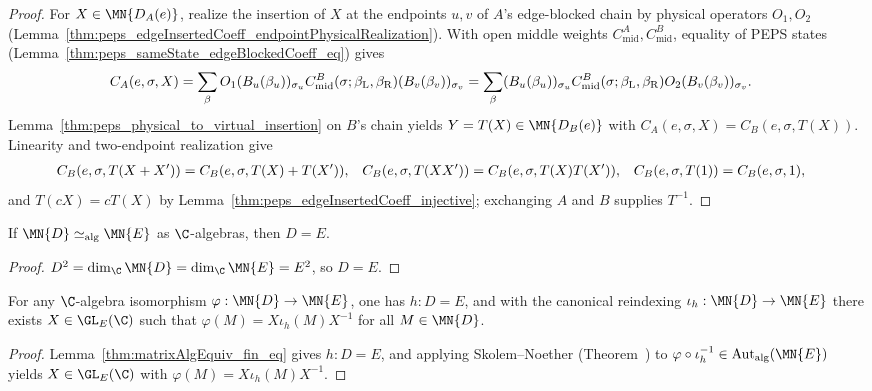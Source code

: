 \begin{proof}\leanok
    For $X\in\MN{D_A(e)}$, realize the insertion of $X$ at the endpoints $u,v$ of $A$'s edge-blocked chain by physical operators $O_1,O_2$ (Lemma~\ref{thm:peps_edgeInsertedCoeff_endpointPhysicalRealization}). With open middle weights $C_{\mathrm{mid}}^A,C_{\mathrm{mid}}^B$, equality of PEPS states (Lemma~\ref{thm:peps_sameState_edgeBlockedCoeff_eq}) gives
    \begin{align}
        C_A(e,\sigma,X)
         & =\sum_{\beta}O_1(B_u(\beta_u))_{\sigma_u}C_{\mathrm{mid}}^B(\sigma;\beta_{\mathrm{L}},\beta_{\mathrm{R}})(B_v(\beta_v))_{\sigma_v}
        =\sum_{\beta}(B_u(\beta_u))_{\sigma_u}C_{\mathrm{mid}}^B(\sigma;\beta_{\mathrm{L}},\beta_{\mathrm{R}})O_2(B_v(\beta_v))_{\sigma_v}.
        \notag
    \end{align}
    Lemma~\ref{thm:peps_physical_to_virtual_insertion} on $B$'s chain yields $Y=T(X)\in\MN{D_B(e)}$ with $C_A(e,\sigma,X)=C_B(e,\sigma,T(X))$. Linearity and two-endpoint realization give
    \begin{align}
        C_B(e,\sigma,T(X+X')) & =C_B(e,\sigma,T(X)+T(X')), &
        C_B(e,\sigma,T(XX'))  & =C_B(e,\sigma,T(X)T(X')),  &
        C_B(e,\sigma,T(1))    & =C_B(e,\sigma,1),
        \notag
    \end{align}
    and $T(cX)=cT(X)$ by Lemma~\ref{thm:peps_edgeInsertedCoeff_injective}; exchanging $A$ and $B$ supplies $T^{-1}$.
\end{proof}

\begin{lemma}%
    \label{thm:matrixAlgEquiv_fin_eq}
    \leanok
    If $\MN{D}\simeq_{\mathrm{alg}}\MN{E}$ as $\C$-algebras, then $D=E$.
\end{lemma}
\begin{proof}\leanok
    $D^2=\dim_{\C}\MN{D}=\dim_{\C}\MN{E}=E^2$, so $D=E$.
\end{proof}

\begin{lemma}%
    \label{thm:matrixAlgEquiv_inner_of_fin}
    \leanok
    For any $\C$-algebra isomorphism $\varphi:\MN{D}\to\MN{E}$, one has $h:D=E$, and with the canonical reindexing $\iota_h:\MN{D}\to\MN{E}$ there exists $X\in\GL_E(\C)$ such that $\varphi(M)=X\iota_h(M)X^{-1}$ for all $M\in\MN{D}$.
\end{lemma}
\begin{proof}\leanok
    Lemma~\ref{thm:matrixAlgEquiv_fin_eq} gives $h:D=E$, and applying Skolem--Noether (Theorem~\cite[``Skolem--Noether'']{QICLean2026Blueprint}) to $\varphi\circ\iota_h^{-1}\in\mathrm{Aut}_{\mathrm{alg}}(\MN{E})$ yields $X\in\GL_E(\C)$ with $\varphi(M)=X\iota_h(M)X^{-1}$.
\end{proof}

